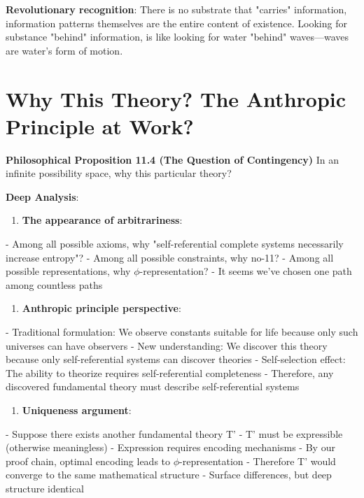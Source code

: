    \textbf{Revolutionary recognition}: There is no substrate that "carries" information,
   information patterns themselves are the entire content of existence.
   Looking for substance "behind" information,
   is like looking for water "behind" waves---waves are water's form of motion.

\section{Why This Theory? The Anthropic Principle at Work?}
\label{sec:ch11_philosophy:why-this-theory-the-anthropic-principle-at-work}

\textbf{Philosophical Proposition 11.4 (The Question of Contingency)}
In an infinite possibility space, why this particular theory?

\textbf{Deep Analysis}:

\begin{enumerate}
\item \textbf{The appearance of arbitrariness}:
\end{enumerate}
   - Among all possible axioms, why "self-referential complete systems necessarily increase entropy"?
   - Among all possible constraints, why no-11?
   - Among all possible representations, why $\phi$-representation?
   - It seems we've chosen one path among countless paths

\begin{enumerate}
\item \textbf{Anthropic principle perspective}:
\end{enumerate}
   - Traditional formulation: We observe constants suitable for life because only such universes can have observers
   - New understanding: We discover this theory because only self-referential systems can discover theories
   - Self-selection effect: The ability to theorize requires self-referential completeness
   - Therefore, any discovered fundamental theory must describe self-referential systems

\begin{enumerate}
\item \textbf{Uniqueness argument}:
\end{enumerate}
   - Suppose there exists another fundamental theory T'
   - T' must be expressible (otherwise meaningless)
   - Expression requires encoding mechanisms
   - By our proof chain, optimal encoding leads to $\phi$-representation
   - Therefore T' would converge to the same mathematical structure
   - Surface differences, but deep structure identical

